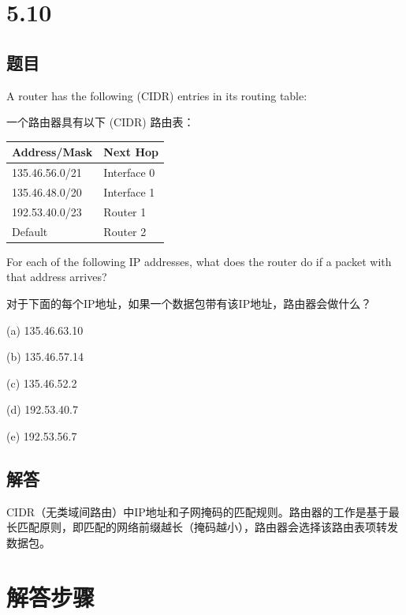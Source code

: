 \section{5.10}

\subsection*{题目}
A router has the following (CIDR) entries in its routing table:

一个路由器具有以下 (CIDR) 路由表：

\begin{table}[H]
    \centering
    \begin{tabular}{|l|l|}
        \hline
        \textbf{Address/Mask} & \textbf{Next Hop}     \\ \hline
        135.46.56.0/21   & Interface 0        \\ \hline
        135.46.48.0/20   & Interface 1        \\ \hline
        192.53.40.0/23   & Router 1        \\ \hline
        Default          & Router 2        \\ \hline
    \end{tabular}
\end{table}

\vspace{1cm}

For each of the following IP addresses, what does the router do if a packet with that
address arrives?

对于下面的每个IP地址，如果一个数据包带有该IP地址，路由器会做什么？

(a) 135.46.63.10

(b) 135.46.57.14

(c) 135.46.52.2

(d) 192.53.40.7

(e) 192.53.56.7

\subsection*{解答}

CIDR（无类域间路由）中IP地址和子网掩码的匹配规则。路由器的工作是基于最长匹配原则，即匹配的网络前缀越长（掩码越小），路由器会选择该路由表项转发数据包。

\section*{解答步骤}

